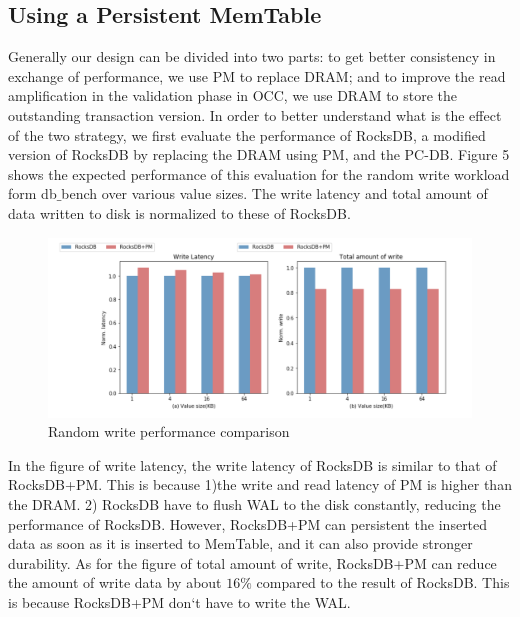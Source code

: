 \subsection{Using a Persistent MemTable}
Generally our design can be divided into two parts: to get better consistency in exchange of performance, we use PM to replace DRAM; and to improve the read amplification in the validation phase in OCC, we use DRAM to store the outstanding transaction version. In order to better understand what is the effect of the two strategy, we first evaluate the performance of RocksDB,  a modified version of RocksDB by replacing the DRAM using PM, and the PC-DB. Figure 5 shows the expected performance of this evaluation for the random write workload form db$\_$bench over various value sizes. The write latency and total amount of data written to disk is normalized to these of RocksDB.
\begin{figure}
    \centering
    \includegraphics[width=0.36\paperwidth]{figure/Randomwrite.png}
    \caption{Random write performance comparison}
    \label{fig:randomwrite}
\end{figure}
In the figure of write latency, the write latency of RocksDB is similar to that of RocksDB+PM. This is because 1)the write and read latency of PM is higher than the DRAM. 2) RocksDB have to flush WAL to the disk constantly, reducing the performance of RocksDB. However, RocksDB+PM can persistent the inserted data as soon as it is inserted to MemTable, and it can also provide stronger durability. As for the figure of total amount of write, RocksDB+PM can reduce the amount of write data by about $16\%$ compared to the result of RocksDB. This is because RocksDB+PM don`t have to write the WAL. 
